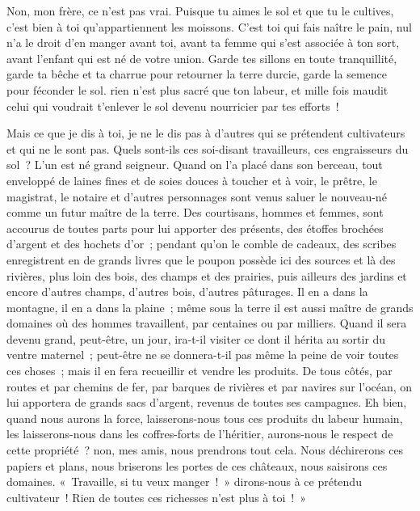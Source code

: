 \documentclass[french,twoside]{book} %
\begin{document}
\noindent Non, mon frère, ce n’est pas vrai. Puisque tu aimes le sol et que tu le cultives, c’est bien à toi qu’appartiennent les moissons. C’est toi qui fais naître le pain, nul n’a le droit d’en manger avant toi, avant ta femme qui s’est associée à ton sort, avant l’enfant qui est né de votre union. Garde tes sillons en toute tranquillité, garde ta bêche et ta charrue pour retourner la terre durcie, garde la semence pour féconder le sol. rien n’est plus sacré que ton labeur, et mille fois maudit celui qui voudrait t’enlever le sol devenu   nourricier par tes efforts !\par
Mais ce que je dis à toi, je ne le dis pas à d’autres qui se prétendent cultivateurs et qui ne le sont pas. Quels sont-ils ces soi-disant travailleurs, ces engraisseurs du sol ? L’un est né grand seigneur. Quand on l’a placé dans son berceau, tout enveloppé de laines fines et de soies douces à toucher et à voir, le prêtre, le magistrat, le notaire et d’autres personnages sont venus saluer le nouveau-né comme un futur maître de la terre. Des courtisans, hommes et femmes, sont accourus de toutes parts pour lui apporter des présents, des étoffes brochées d’argent et des hochets d’or ; pendant qu’on le comble de cadeaux, des scribes enregistrent en de grands livres que le poupon possède ici des sources et là des rivières, plus loin des bois, des champs et des prairies, puis ailleurs des jardins et encore d’autres champs, d’autres bois, d’autres pâturages. Il en a dans la montagne, il en a dans la plaine ; même sous la terre il est aussi maître de grands domaines où des hommes travaillent, par centaines ou par milliers. Quand il sera devenu grand, peut-être, un jour, ira-t-il visiter ce dont il hérita au sortir du ventre maternel ; peut-être ne se donnera-t-il pas même la peine de voir toutes ces choses ; mais il en fera recueillir  et vendre les produits. De tous côtés, par routes et par chemins de fer, par barques de rivières et par navires sur l’océan, on lui apportera de grands sacs d’argent, revenus de toutes ses campagnes. Eh bien, quand nous aurons la force, laisserons-nous tous ces produits du labeur humain, les laisserons-nous dans les coffres-forts de l’héritier, aurons-nous le respect de cette propriété ? non, mes amis, nous prendrons tout cela. Nous déchirerons ces papiers et plans, nous briserons les portes de ces châteaux, nous saisirons ces domaines. « Travaille, si tu veux manger ! » dirons-nous à ce prétendu cultivateur ! Rien de toutes ces richesses n’est plus à toi ! »\par
\end{document}
